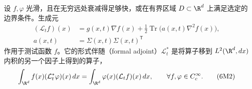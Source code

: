 

设 $f,\varphi$ 光滑，且在无穷远处衰减得足够快，或在有界区域 $D\subset\R^d$ 上满足选定的边界条件。生成元
\begin{equation*}
  \begin{aligned}
  (\mathcal L_tf)(x)&=g(x,t)\nabla f(x)+
             \tfrac12\operatorname{Tr}\bigl(a(x,t)\nabla^2f(x)\bigr),\\
  a(x,t)&=\Sigma(x,t)\Sigma(x,t)^{\mathsf T}
  \end{aligned}
  \tag{6M1}\label{eq:6M1}
\end{equation*}
作用于测试函数 $f$。它的形式伴随（formal adjoint）$\mathcal L_t^*$ 是将算子移到 $L^2(\R^d,dx)$ 内积的另一个因子上得到的算子，
\begin{equation*}
  \int_{\R^d} f(x)(\mathcal L_t^*\varphi)(x)\,dx
   =\int_{\R^d}\varphi(x)(\mathcal L_tf)(x)\,dx,\qquad
    \forall f,\varphi\in C_c^\infty.
  \tag{6M2}\label{eq:6M2}
\end{equation*}


